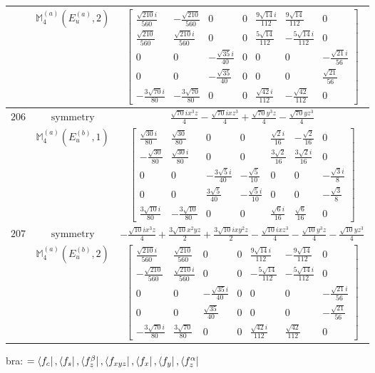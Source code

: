 \documentclass[fleqn,8pt,landscape]{jsarticle}
\begin{document}
\begin{longtable}{ccc}
$  $ & $ \mathbb{M}_{4}^{(a)}(E_{u}^{(a)},2) $ & $ \begin{bmatrix} \frac{\sqrt{210} i}{560} & - \frac{\sqrt{210}}{560} & 0 & 0 & \frac{9 \sqrt{14} i}{112} & \frac{9 \sqrt{14}}{112} & 0 \\ \frac{\sqrt{210}}{560} & \frac{\sqrt{210} i}{560} & 0 & 0 & \frac{5 \sqrt{14}}{112} & - \frac{5 \sqrt{14} i}{112} & 0 \\ 0 & 0 & - \frac{\sqrt{35} i}{40} & 0 & 0 & 0 & - \frac{\sqrt{21} i}{56} \\ 0 & 0 & - \frac{\sqrt{35}}{40} & 0 & 0 & 0 & \frac{\sqrt{21}}{56} \\ - \frac{3 \sqrt{70} i}{80} & - \frac{3 \sqrt{70}}{80} & 0 & 0 & \frac{\sqrt{42} i}{112} & - \frac{\sqrt{42}}{112} & 0 \end{bmatrix} $ \\ \hline
$ 206 $ & $ \text{symmetry} $ & $ \frac{\sqrt{70} i x^{3} z}{4} - \frac{\sqrt{70} i x z^{3}}{4} + \frac{\sqrt{70} y^{3} z}{4} - \frac{\sqrt{70} y z^{3}}{4} $ \\
$  $ & $ \mathbb{M}_{4}^{(a)}(E_{u}^{(b)},1) $ & $ \begin{bmatrix} \frac{\sqrt{30} i}{80} & \frac{\sqrt{30}}{80} & 0 & 0 & \frac{\sqrt{2} i}{16} & - \frac{\sqrt{2}}{16} & 0 \\ - \frac{\sqrt{30}}{80} & \frac{\sqrt{30} i}{80} & 0 & 0 & \frac{3 \sqrt{2}}{16} & \frac{3 \sqrt{2} i}{16} & 0 \\ 0 & 0 & - \frac{3 \sqrt{5} i}{40} & - \frac{\sqrt{5}}{10} & 0 & 0 & - \frac{\sqrt{3} i}{8} \\ 0 & 0 & \frac{3 \sqrt{5}}{40} & - \frac{\sqrt{5} i}{10} & 0 & 0 & - \frac{\sqrt{3}}{8} \\ \frac{3 \sqrt{10} i}{80} & - \frac{3 \sqrt{10}}{80} & 0 & 0 & \frac{\sqrt{6} i}{16} & \frac{\sqrt{6}}{16} & 0 \end{bmatrix} $ \\ \hline
$ 207 $ & $ \text{symmetry} $ & $ - \frac{\sqrt{10} i x^{3} z}{4} + \frac{3 \sqrt{10} x^{2} y z}{2} + \frac{3 \sqrt{10} i x y^{2} z}{2} - \frac{\sqrt{10} i x z^{3}}{4} - \frac{\sqrt{10} y^{3} z}{4} - \frac{\sqrt{10} y z^{3}}{4} $ \\
$  $ & $ \mathbb{M}_{4}^{(a)}(E_{u}^{(b)},2) $ & $ \begin{bmatrix} \frac{\sqrt{210} i}{560} & \frac{\sqrt{210}}{560} & 0 & 0 & \frac{9 \sqrt{14} i}{112} & - \frac{9 \sqrt{14}}{112} & 0 \\ - \frac{\sqrt{210}}{560} & \frac{\sqrt{210} i}{560} & 0 & 0 & - \frac{5 \sqrt{14}}{112} & - \frac{5 \sqrt{14} i}{112} & 0 \\ 0 & 0 & - \frac{\sqrt{35} i}{40} & 0 & 0 & 0 & - \frac{\sqrt{21} i}{56} \\ 0 & 0 & \frac{\sqrt{35}}{40} & 0 & 0 & 0 & - \frac{\sqrt{21}}{56} \\ - \frac{3 \sqrt{70} i}{80} & \frac{3 \sqrt{70}}{80} & 0 & 0 & \frac{\sqrt{42} i}{112} & \frac{\sqrt{42}}{112} & 0 \end{bmatrix} $ \\ \hline
\end{longtable}
bra: $=\bra{f_{c}}, \bra{f_{s}}, \bra{f_{z}^{\beta}}, \bra{f_{xyz}}, \bra{f_{x}}, \bra{f_{y}}, \bra{f_{z}^{\alpha}}$
\end{document}
